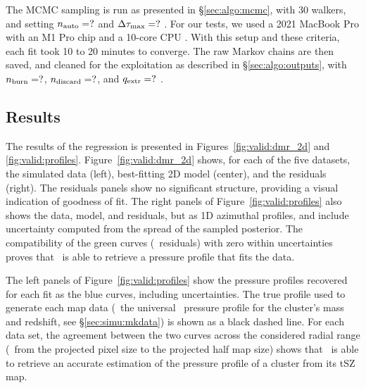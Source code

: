 The MCMC sampling is run as presented in \S\ref{sec:algo:mcmc}, with $30$ walkers, and setting $n_{\rm auto} = ?$ and $\Delta\tau_{\rm max} = ?$ .
For our tests, we used a 2021 MacBook Pro with an M1 Pro chip and a 10-core CPU .
With this setup and these criteria, each fit took 10 to 20 minutes to converge.
The raw Markov chains are then saved, and cleaned for the exploitation as described in \S\ref{sec:algo:outputs}, with $n_{\rm burn} = ?$, $n_{\rm discard} = ?$, and $q_{\rm extr} = ?$ .

\subsection{Results} \label{sec:simu:results}

The results of the regression is presented in Figures~\ref{fig:valid:dmr_2d} and \ref{fig:valid:profiles}.
Figure~\ref{fig:valid:dmr_2d} shows, for each of the five datasets, the simulated data (left), best-fitting 2D model (center), and the residuals (right).
The residuals panels show no significant structure, providing a visual indication of goodness of fit.
The right panels of Figure~\ref{fig:valid:profiles} also shows the data, model, and residuals, but as 1D azimuthal profiles, and include uncertainty computed from the spread of the sampled posterior.
The compatibility of the green curves (\ie\ residuals) with zero within uncertainties proves that \panco\ is able to retrieve a pressure profile that fits the data.

The left panels of Figure~\ref{fig:valid:profiles} show the pressure profiles recovered for each fit as the blue curves, including uncertainties.
The true profile used to generate each map data (\ie\ the universal \aten\ pressure profile for the cluster's mass and redshift, see \S\ref{sec:simu:mkdata}) is shown as a black dashed line.
For each data set, the agreement between the two curves across the considered radial range (\ie\ from the projected pixel size to the projected half map size) shows that \panco\ is able to retrieve an accurate estimation of the pressure profile of a cluster from its tSZ map.

